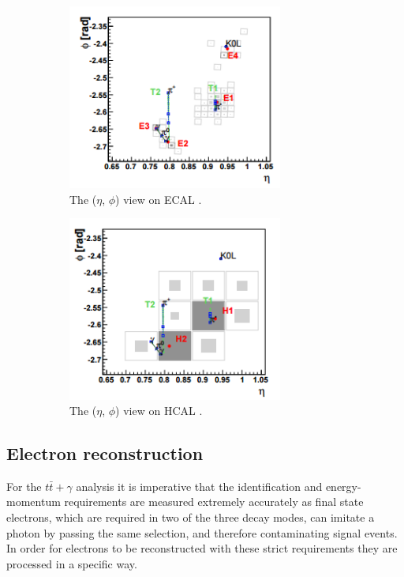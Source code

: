 \begin{figure}
\begin{center}
\begin{subfigure}{0.5\textwidth}
    \centering\includegraphics[width=200pt]{Figures/PFECAL.png}
    \caption{The ($\eta$, $\phi$) view on ECAL \cite{CMS-PAS-PFT-09-001}. \label{fig:fig1}}
\end{subfigure}
\begin{subfigure}{0.5\textwidth}
    \centering\includegraphics[width=200pt]{Figures/PFHCAL.png}
    \caption{The ($\eta$, $\phi$) view on HCAL \cite{CMS-PAS-PFT-09-001}. \label{fig:fig2}}
\end{subfigure}
\caption{}
\end{center}
\end{figure}
   

\subsection{Electron reconstruction} \label{subsec-ElectronReconstruction}

For the $t\bar{t}+\gamma$ analysis it is imperative that the identification and energy-momentum requirements are measured extremely accurately as final state electrons, which are required in two of the three decay modes, can imitate a photon by passing the same selection, and therefore contaminating signal events. In order for electrons to be reconstructed with these strict requirements they are processed in a specific way.

